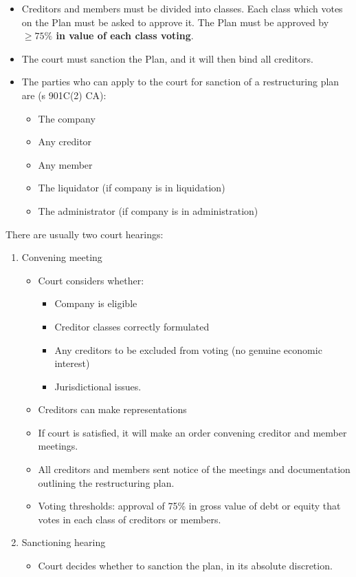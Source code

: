 \documentclass[
]{article}
\providecommand{\tightlist}{%
  \setlength{\itemsep}{0pt}\setlength{\parskip}{0pt}}
\begin{document}
\begin{itemize}
\tightlist
\item
  Creditors and members must be divided into classes. Each class which
  votes on the Plan must be asked to approve it. The Plan must be
  approved by \textbf{{\(\geq 75\%\)} in value of each class voting}.
\item
  The court must sanction the Plan, and it will then bind all creditors.
\item
  The parties who can apply to the court for sanction of a restructuring
  plan are (s 901C(2) CA):

  \begin{itemize}
  \tightlist
  \item
    The company
  \item
    Any creditor
  \item
    Any member
  \item
    The liquidator (if company is in liquidation)
  \item
    The administrator (if company is in administration)
  \end{itemize}
\end{itemize}

There are usually two court hearings:

\begin{enumerate}
\tightlist
\item
  Convening meeting

  \begin{itemize}
  \tightlist
  \item
    Court considers whether:

    \begin{itemize}
    \tightlist
    \item
      Company is eligible
    \item
      Creditor classes correctly formulated
    \item
      Any creditors to be excluded from voting (no genuine economic
      interest)
    \item
      Jurisdictional issues.
    \end{itemize}
  \item
    Creditors can make representations
  \item
    If court is satisfied, it will make an order convening creditor and
    member meetings.
  \item
    All creditors and members sent notice of the meetings and
    documentation outlining the restructuring plan.
  \item
    Voting thresholds: approval of 75\% in gross value of debt or equity
    that votes in each class of creditors or members.
  \end{itemize}
\item
  Sanctioning hearing

  \begin{itemize}
  \tightlist
  \item
    Court decides whether to sanction the plan, in its absolute
    discretion.
  \end{itemize}
\end{enumerate}
\end{document}
